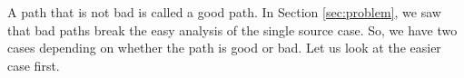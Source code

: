 A path that is not bad is called a good path. In Section \ref{sec:problem}, we saw that
bad paths break the easy analysis of the single source case.
So, we have two cases depending on whether the path is good or bad. Let us look at the easier case first.\iflong\\\else\vspace{1mm}\fi


\iflong
\else

\fi
\iflong\fi


